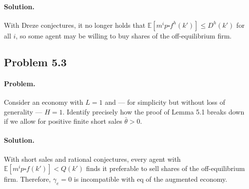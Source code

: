 \paragraph{Solution.}
With Dreze conjectures, it no longer holds that $\mathbb{E}[m^i p \square f^h(k')] \leq D^h(k')$ for all $i$, so some agent may be willing to buy shares of the off-equilibrium firm.

\subsection{Problem 5.3}
\paragraph{Problem.} Consider an economy with $L = 1$ and --- for simplicity but without loss of generality --- $H = 1$. Identify precisely how the proof of Lemma 5.1 breaks down if we allow for positive finite short sales $\bar{\theta} > 0$.

\paragraph{Solution.}
With short sales and rational conjectures, every agent with $\mathbb{E}[m^i p \square f(k')] < Q(k')$ finds it preferable to sell shares of the off-equilibrium firm. Therefore, $\gamma_e = 0$ is incompatible with eq of the augmented economy.
